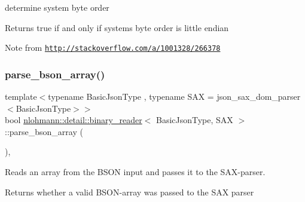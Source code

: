 determine system byte order 

\begin{DoxyReturn}{Returns}
true if and only if system\textquotesingle{}s byte order is little endian
\end{DoxyReturn}
\begin{DoxyNote}{Note}
from \href{http://stackoverflow.com/a/1001328/266378}{\tt http\+://stackoverflow.\+com/a/1001328/266378} 
\end{DoxyNote}
\mbox{\label{classnlohmann_1_1detail_1_1binary__reader_a650dd6f9f05e86eb62cd4717301a5ffa}} 
\subsubsection{\texorpdfstring{parse\+\_\+bson\+\_\+array()}{parse\_bson\_array()}}
{\footnotesize\ttfamily template$<$typename Basic\+Json\+Type , typename S\+AX  = json\+\_\+sax\+\_\+dom\+\_\+parser$<$\+Basic\+Json\+Type$>$$>$ \\
bool \mbox{\hyperlink{classnlohmann_1_1detail_1_1binary__reader}{nlohmann\+::detail\+::binary\+\_\+reader}}$<$ Basic\+Json\+Type, S\+AX $>$\+::parse\+\_\+bson\+\_\+array (\begin{DoxyParamCaption}{ }\end{DoxyParamCaption})\hspace{0.3cm}{\ttfamily [inline]}, {\ttfamily [private]}}



Reads an array from the B\+S\+ON input and passes it to the S\+A\+X-\/parser. 

\begin{DoxyReturn}{Returns}
whether a valid B\+S\+O\+N-\/array was passed to the S\+AX parser 
\end{DoxyReturn}
\mbox{\label{classnlohmann_1_1detail_1_1binary__reader_a2fdd24de008063e7fef896327daeffa1}} 
